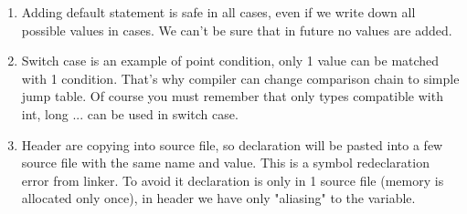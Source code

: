 \begin{enumerate}
\begin{itemize}
        \end{itemize}
    \item Adding default statement is safe in all cases, even if we write down all possible values in cases. We can't be sure that in future no values are added.
    \item Switch case is an example of point condition, only 1 value can be matched with 1 condition. That's why compiler can change comparison chain to simple jump table. Of course you must remember that only types compatible with int, long ... can be used in switch case.
    \item Header are copying into source file, so declaration will be pasted into a few source file with the same name and value. This is a symbol redeclaration error from linker. To avoid it declaration is only in 1 source file (memory is allocated only once), in header we have only "aliasing" to the variable.
\end{enumerate}